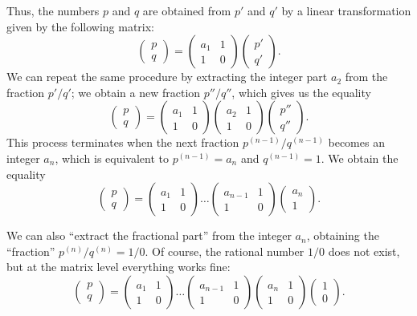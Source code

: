\documentclass[a4paper,11pt]{amsart}
\theoremstyle{plain}
\theoremstyle{remark}
\theoremstyle{definition}
\numberwithin{equation}{section}
\numberwithin{figure}{section}
\begin{document}
Thus, the numbers $p$ and $q$ are obtained from $p'$ and $q'$ by a linear transformation given by the following matrix:
\[
\begin{pmatrix}p\\q
\end{pmatrix}=
\begin{pmatrix}a_1 & 1\\1 & 0
\end{pmatrix}
\begin{pmatrix}p'\\q'
\end{pmatrix}.
\]
We can repeat the same procedure by extracting the integer part $a_2$ from the fraction $p'/q'$; we obtain a new fraction $p''/q''$, which gives us the equality
\[
\begin{pmatrix}p\\q
\end{pmatrix}=
\begin{pmatrix}a_1 & 1\\1 & 0
\end{pmatrix}
\begin{pmatrix}a_2 & 1\\1 & 0
\end{pmatrix}
\begin{pmatrix}p''\\q''
\end{pmatrix}.
\]
This process terminates when the next fraction $p^{(n-1)}/q^{(n-1)}$ becomes an integer $a_n$, which is equivalent to $p^{(n-1)} = a_n$ and $q^{(n-1)} = 1$. We obtain the equality
\[
\begin{pmatrix}p\\q
\end{pmatrix}=
\begin{pmatrix}a_1 & 1\\1 & 0
\end{pmatrix}
\dots \begin{pmatrix}a_{n-1} & 1\\1 & 0
\end{pmatrix}
\begin{pmatrix}a_n\\1
\end{pmatrix}.
\]

We can also ``extract the fractional part'' from the integer $a_n$, obtaining the ``fraction'' $p^{(n)}/q^{(n)} = 1/0$. Of course, the rational number $1/0$ does not exist, but at the matrix level everything works fine:
\[
\begin{pmatrix}p\\q
\end{pmatrix}=
\begin{pmatrix}a_1 & 1\\1 & 0
\end{pmatrix}
\dots \begin{pmatrix}a_{n-1} & 1\\1 & 0
\end{pmatrix}
\begin{pmatrix}a_n & 1\\1 & 0
\end{pmatrix}
\begin{pmatrix}1\\0
\end{pmatrix}.
\]
\end{document}
